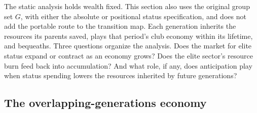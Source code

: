 \documentclass[12pt,letterpaper]{article}
\theoremstyle{definition}
\begin{document}
The static analysis holds wealth fixed.
This section also uses the original group set $G$, with either the absolute or positional
status specification, and does not add the portable route to the transition map.
Each generation inherits the resources its parents saved, plays that period's club economy
within its lifetime, and bequeaths.
Three questions organize the analysis.
Does the market for elite status expand or contract as an economy grows?
Does the elite sector's resource burn feed back into accumulation?
And what role, if any, does anticipation play when status spending lowers the resources inherited by future generations?

\subsection{The overlapping-generations economy}
\end{document}
